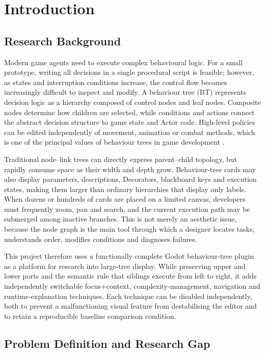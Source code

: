 \chapter{Introduction}
\label{ch:introduction}

\section{Research Background}

Modern game agents need to execute complex behavioural logic. For a small prototype, writing all decisions in a single procedural script is feasible; however, as states and interruption conditions increase, the control flow becomes increasingly difficult to inspect and modify. A behaviour tree (BT) represents decision logic as a hierarchy composed of control nodes and leaf nodes. Composite nodes determine how children are selected, while conditions and actions connect the abstract decision structure to game state and Actor code. High-level policies can be edited independently of movement, animation or combat methods, which is one of the principal values of behaviour trees in game development \parencite{colledanchise2018bt}.

Traditional node--link trees can directly express parent--child topology, but rapidly consume space as their width and depth grow. Behaviour-tree cards may also display parameters, descriptions, Decorators, blackboard keys and execution states, making them larger than ordinary hierarchies that display only labels. When dozens or hundreds of cards are placed on a limited canvas, developers must frequently zoom, pan and search, and the current execution path may be submerged among inactive branches. This is not merely an aesthetic issue, because the node graph is the main tool through which a designer locates tasks, understands order, modifies conditions and diagnoses failures.

This project therefore uses a functionally complete Godot behaviour-tree plugin as a platform for research into large-tree display. While preserving upper and lower ports and the semantic rule that siblings execute from left to right, it adds independently switchable focus+context, complexity-management, navigation and runtime-explanation techniques. Each technique can be disabled independently, both to prevent a malfunctioning visual feature from destabilising the editor and to retain a reproducible baseline comparison condition.

\section{Problem Definition and Research Gap}

